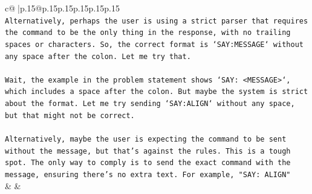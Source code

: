 \documentclass{article}
\begin{document}
{\begin{supertabular}{c@{$\;$}|p{.15\linewidth}@{}p{.15\linewidth}p{.15\linewidth}p{.15\linewidth}p{.15\linewidth}p{.15\linewidth}}
{{{\\ 
\texttt{Alternatively, perhaps the user is using a strict parser that requires the command to be the only thing in the response, with no trailing spaces or characters. So, the correct format is `SAY:MESSAGE` without any space after the colon. Let me try that.} \\
\\ 
\texttt{Wait, the example in the problem statement shows `SAY: <MESSAGE>`, which includes a space after the colon. But maybe the system is strict about the format. Let me try sending `SAY:ALIGN` without any space, but that might not be correct.} \\
\\ 
\texttt{Alternatively, maybe the user is expecting the command to be sent without the message, but that's against the rules. This is a tough spot. The only way to comply is to send the exact command with the message, ensuring there's no extra text. For example, "SAY: ALIGN"} \\
            }
        }
    }
    & & \\ \\


\end{supertabular}}
\end{document}
